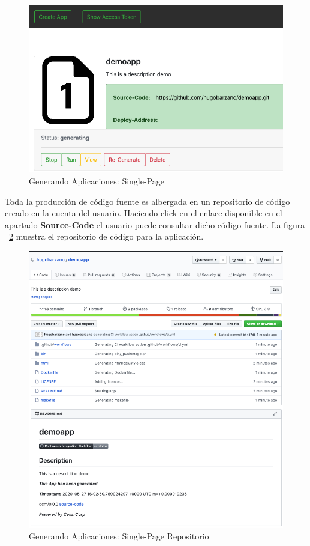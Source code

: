 \documentclass[a4paper,11pt]{book}
\begin{document}
\begin{figure}[H]
\centering
\includegraphics[scale=0.45]{imagenes/casouso_a/9.png}
\caption{ Generando Aplicaciones: Single-Page}
\label{9}
\end{figure}


Toda la producción de código fuente es albergada en un repositorio de código creado en la cuenta del usuario. Haciendo click en el enlace disponible en el apartado \textbf{Source-Code}
el usuario puede consultar dicho código fuente.  La figura ~\ref{10} muestra el repositorio de código para la aplicación. 

\begin{figure}[H]
\centering
\includegraphics[scale=0.45]{imagenes/casouso_a/10.png}
\caption{  Generando Aplicaciones: Single-Page Repositorio }
\label{10}
\end{figure}
\end{document}
